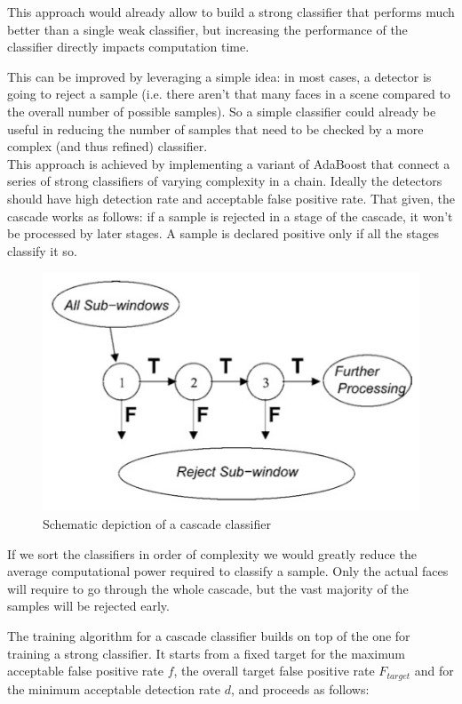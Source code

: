 \documentclass[a4paper,11pt,titlepage]{article}
\begin{document}
This approach would already allow to build a strong classifier that performs
much better than a single weak classifier, but increasing the performance of the
classifier directly impacts computation time.

This can be improved by leveraging a simple idea: in most cases, a detector is
going to reject a sample (i.e. there aren't that many faces in a scene compared
to the overall number of possible samples). So a simple classifier could already
be useful in reducing the number of samples that need to be checked by a more
complex (and thus refined) classifier. \\
This approach is achieved by implementing a variant of AdaBoost \cite{adaboost}
that connect a series of strong classifiers of varying complexity in a chain.
Ideally the detectors should have high detection rate and acceptable false
positive rate. That given, the cascade works as follows: if a sample is
rejected in a stage of the cascade, it won't be processed by later stages. A
sample is declared positive only if all the stages classify it so.

\begin{figure}[h]
  \centering
  \includegraphics[scale=0.5]{cascade_classifier.jpg}
  \caption{Schematic depiction of a cascade classifier}
  \label{fig:cascade_classifier}
\end{figure}

If we sort the classifiers in order of complexity we would greatly reduce the
average computational power required to classify a sample. Only the actual faces
will require to go through the whole cascade, but the vast majority of the
samples will be rejected early.

The training algorithm for a cascade classifier builds on top of the one for
training a strong classifier. It starts from a fixed target for the maximum
acceptable false positive rate $f$, the overall target false positive rate
$F_{target}$ and for the minimum acceptable detection rate $d$, and proceeds as
follows:
\end{document}
